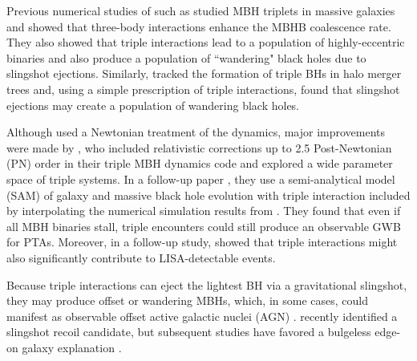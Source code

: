 \documentclass[twocolumn,linenumbers]{aastex701}
\begin{document}
Previous numerical studies of such as \citet{hoffman_dynamics_2007} studied MBH triplets in massive galaxies and showed that three-body interactions enhance the MBHB coalescence rate. They also showed that triple interactions lead to a population of highly-eccentric binaries and also produce a population of ``wandering" black holes due to slingshot ejections. Similarly, \citet{volonteri_assembly_2003} tracked the formation of triple BHs in halo merger trees and, using a simple prescription of triple interactions, found that slingshot ejections may create a population of wandering black holes.

Although \citet{hoffman_dynamics_2007} used a Newtonian treatment of the dynamics, major improvements were made by \citet{bonetti_post-newtonian_2016,bonetti_post-newtonian_2018-1}, who included relativistic corrections up to 2.5 Post-Newtonian (PN) order in their triple MBH dynamics code and
explored a wide parameter space of triple systems. In a follow-up paper \cite{bonetti_post-newtonian_2018}, they use a semi-analytical model (SAM) of galaxy and massive black hole evolution with triple interaction included by interpolating the numerical simulation results from \citet{bonetti_post-newtonian_2018-1}. 
They found that even if all MBH binaries stall, triple encounters could still produce an observable GWB for PTAs. Moreover, in a follow-up study, \citet{bonetti_post-newtonian_2019} showed that triple interactions might also significantly contribute to LISA-detectable events. 

Because triple interactions can eject the lightest BH via a gravitational slingshot, they may produce
offset or wandering MBHs, which, in some cases, could manifest as observable offset active galactic nuclei (AGN) \citep{Madau_2004,Loeb_2007, blecha_effects_2008, barrows_spatially_2016, Blecha_2019_Astro2020}. \citet{vanDokkum2023} recently identified a slingshot recoil candidate, but subsequent studies have
favored a bulgeless edge-on galaxy explanation \citep{Sanchez2023,Sanchez2023b,Montes2024}.
\end{document}
